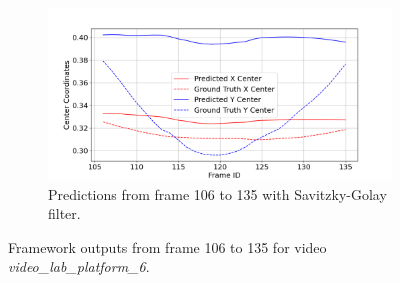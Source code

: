 \documentclass[12pt,oneside]{book} %
\begin{document}
\begin{figure}[H]
    \begin{subfigure}[t]{0.9\textwidth}
        \includegraphics[width=\textwidth]{figures/framework/video_lab_platform_6 SA Filter - 2.png}
        \caption{Predictions from frame 106 to 135 with Savitzky-Golay filter.}
        \label{fig:framework-video_lab_platform_6-2-sa}
    \end{subfigure}
    \caption{Framework outputs from frame 106 to 135 for video \textit{video\_lab\_platform\_6}.}
    \label{fig:framework-video_lab_platform_6-2}
\end{figure}
\end{document}
